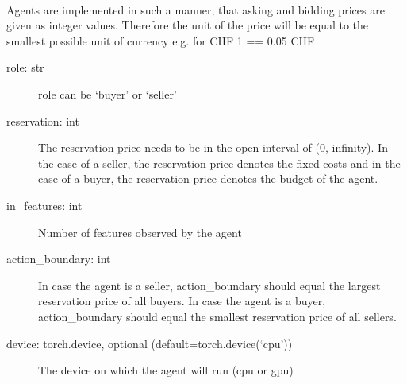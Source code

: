\documentclass[letterpaper,10pt,english]{sphinxmanual}
\begin{document}
\begin{fulllineitems}
\label{\detokenize{MultiAgentMarketRL:agents.DQNAgent}}~

\begin{fulllineitems}
\label{\detokenize{MultiAgentMarketRL:agents.DQNAgent.__init__}}
\sphinxAtStartPar
Agents are implemented in such a manner, that asking and bidding prices are given as integer values. Therefore
the unit of the price will be equal to the smallest possible unit of currency e.g. for CHF 1 == 0.05 CHF
\begin{description}
\item[{role: str}] \leavevmode
\sphinxAtStartPar
role can be ‘buyer’ or ‘seller’

\item[{reservation: int}] \leavevmode
\sphinxAtStartPar
The reservation price needs to be in the open interval of (0, infinity). In the case of a seller, the
reservation price denotes the fixed costs and in the case of a buyer, the reservation price denotes the
budget of the agent.

\item[{in\_features: int}] \leavevmode
\sphinxAtStartPar
Number of features observed by the agent

\item[{action\_boundary: int}] \leavevmode
\sphinxAtStartPar
In case the agent is a seller, action\_boundary should equal the largest reservation price of all buyers.
In case the agent is a buyer, action\_boundary should equal the smallest reservation price of all sellers.

\item[{device: torch.device, optional (default=torch.device(‘cpu’))}] \leavevmode
\sphinxAtStartPar
The device on which the agent will run (cpu or gpu)


\end{description}
\end{fulllineitems}
\end{fulllineitems}
\end{document}
